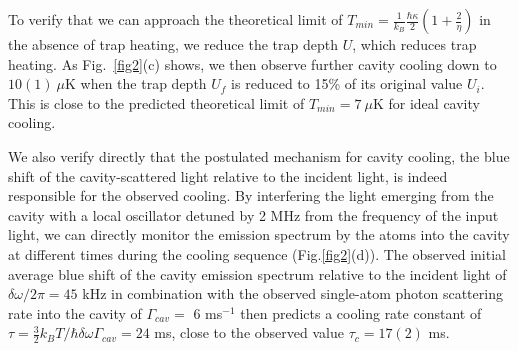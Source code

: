 \documentclass[aps,prl,superscriptaddress,onecloumn,nobibnotes]{revtex4-1}
\begin{document}


To verify that we can approach the theoretical limit of $T_{min}=\frac{1}{k_B}\frac{\hbar\kappa}{2} (1+\frac{2}{\eta})$ in the absence of trap heating, we reduce the trap depth $U$, which reduces trap heating. As Fig.~\ref{fig2}(c) shows, we then observe further cavity cooling down to $10(1) ~\mu$K when the trap depth $U_f$ is reduced to 15\% of its original value $U_i$. This is close to the predicted theoretical limit of $T_{min}=7 ~\mu$K for ideal cavity cooling.\par

We also verify directly that the postulated mechanism for cavity cooling, the blue shift of the cavity-scattered light relative to the incident light, is indeed responsible for the observed cooling. By interfering the light emerging from the cavity with a local oscillator detuned by 2 MHz from the frequency of the input light, we can directly monitor the emission spectrum by the atoms into the cavity at different times during the cooling sequence (Fig.\ref{fig2}(d)). The observed initial average blue shift of the cavity emission spectrum relative to the incident light of $\delta\omega/2\pi=45$ kHz in combination with the observed single-atom photon scattering rate into the cavity of $\Gamma_{cav}=$ 6 ms$^{-1}$ then predicts a cooling rate constant of $\tau=\frac{3}{2}k_B T/\hbar \delta \omega \Gamma_{cav}=24$ ms,  close to the observed value $\tau_c=17(2)$ ms.
\end{document}
